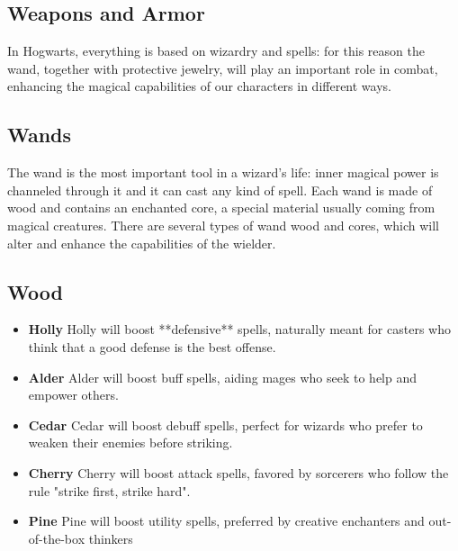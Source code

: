 \subsection{Weapons and Armor}

In Hogwarts, everything is based on wizardry and spells: for this reason the wand, together with protective jewelry, will play an important role in combat, enhancing the magical capabilities of our characters in different ways.

\subsection{Wands}

The wand is the most important tool in a wizard's life: inner magical power is channeled through it and it can cast any kind of spell. Each wand is made of wood and contains an enchanted core, a special material usually coming from magical creatures.
There are several types of wand wood and cores, which will alter and enhance the capabilities of the wielder.

\subsection{Wood}

\begin{itemize}
    \item \textbf{Holly} 
Holly will boost **defensive** spells, naturally meant for casters who think that a good defense is the best offense. 

 \item \textbf{Alder}
Alder will boost buff spells, aiding mages who seek to help and empower others.

 \item \textbf{Cedar}
Cedar will boost debuff spells, perfect for wizards who prefer to weaken their enemies before striking.

 \item \textbf {Cherry}
Cherry will boost attack spells, favored by sorcerers who follow the rule "strike first, strike hard".

 \item \textbf{Pine}
Pine will boost utility spells, preferred by creative enchanters and out-of-the-box thinkers
\end{itemize}

